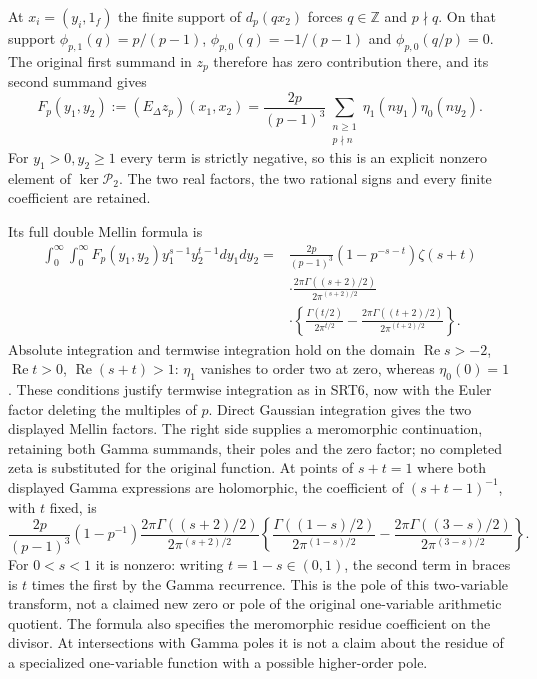 At $x_i=(y_i,1_f)$ the finite support of $d_p(qx_2)$ forces
$q\in\mathbb Z$ and $p\nmid q$. On that support
$\phi_{p,1}(q)=p/(p-1)$, $\phi_{p,0}(q)=-1/(p-1)$ and
$\phi_{p,0}(q/p)=0$. The original first summand in $z_p$ therefore
has zero contribution there, and its second summand gives
\begin{equation}\tag{SRT9}
F_p(y_1,y_2):=(E_\Delta z_p)(x_1,x_2)
 =\frac{2p}{(p-1)^3}\sum_{\substack{n\ge1\\p\nmid n}}
            \eta_1(ny_1)\eta_0(ny_2).
\end{equation}
For $y_1>0,y_2\ge1$ every term is strictly negative, so this is an
explicit nonzero element of $\ker\mathcal P_2$. The two real factors,
the two rational signs and every finite coefficient are retained.

Its full double Mellin formula is
\begin{equation}\tag{SRT10}
\begin{split}
\int_0^\infty\!\int_0^\infty F_p(y_1,y_2)y_1^{s-1}y_2^{t-1}dy_1dy_2
={}&\frac{2p}{(p-1)^3}(1-p^{-s-t})\zeta(s+t)\\
&\cdot\frac{2\pi\Gamma((s+2)/2)}{2\pi^{(s+2)/2}}\\
&\cdot\left\{\frac{\Gamma(t/2)}{2\pi^{t/2}}
       -\frac{2\pi\Gamma((t+2)/2)}{2\pi^{(t+2)/2}}\right\}.
\end{split}
\end{equation}
Absolute integration and termwise integration hold on the domain
$\operatorname{Re}s>-2$, $\operatorname{Re}t>0$,
$\operatorname{Re}(s+t)>1$: $\eta_1$ vanishes to order two at zero,
whereas $\eta_0(0)=1$. These conditions justify termwise integration
as in SRT6, now with the Euler factor deleting the multiples of $p$.
Direct Gaussian integration gives the two displayed Mellin factors.
The right side supplies a meromorphic continuation, retaining both
Gamma summands, their poles and the zero factor; no completed zeta
is substituted for the original function. At points of $s+t=1$ where
both displayed Gamma expressions are holomorphic, the coefficient of
$(s+t-1)^{-1}$, with $t$ fixed, is
\begin{equation}\tag{SRT11}
\frac{2p}{(p-1)^3}(1-p^{-1})
 \frac{2\pi\Gamma((s+2)/2)}{2\pi^{(s+2)/2}}
 \left\{\frac{\Gamma((1-s)/2)}{2\pi^{(1-s)/2}}
 -\frac{2\pi\Gamma((3-s)/2)}{2\pi^{(3-s)/2}}\right\}.
\end{equation}
For $0<s<1$ it is nonzero: writing $t=1-s\in(0,1)$, the
second term in braces is $t$ times the first by the Gamma recurrence.
This is the pole of this two-variable transform, not a claimed new
zero or pole of the original one-variable arithmetic quotient.
The formula also specifies the meromorphic residue coefficient on
the divisor. At intersections with Gamma poles it is not a claim
about the residue of a specialized one-variable function with a
possible higher-order pole.

